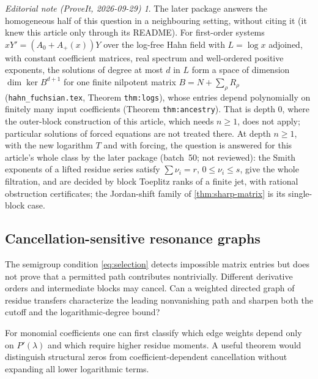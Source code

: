 \documentclass[11pt,a4paper]{article}
\numberwithin{equation}{section}
\theoremstyle{definition}
\theoremstyle{remark}
\newtheorem*{ednote}{Editorial note (ProveIt, 2026-09-29)}
\begin{document}
\begin{ednote}\label{ed:filtration}
The later package  answers the homogeneous half of this question in a neighbouring setting, without citing it (it knew this article only through its README). For first-order systems $xY'=(A_0+A_+(x))Y$ over the log-free Hahn field with $L=\log x$ adjoined, with constant coefficient matrices, real spectrum and well-ordered positive exponents, the solutions of degree at most $d$ in $L$ form a space of dimension $\dim\ker B^{d+1}$ for one finite nilpotent matrix $B=N+\sum_\rho R_\rho$ (\texttt{hahn\_fuchsian.tex}, Theorem \texttt{thm:logs}), whose entries depend polynomially on finitely many input coefficients (Theorem \texttt{thm:ancestry}). That is depth $0$, where the outer-block construction of this article, which needs $n\ge1$, does not apply; particular solutions of forced equations are not treated there.
At depth $n\ge1$, with the new logarithm $T$ and with forcing, the question is answered for this article's whole class by the later package  (batch~50; not reviewed): the Smith exponents of a lifted residue series satisfy $\sum\nu_i=r$, $0\le\nu_i\le s$, give the whole filtration, and are decided by block Toeplitz ranks of a finite jet, with rational obstruction certificates; the Jordan-shift family of \cref{thm:sharp-matrix} is its single-block case.
\end{ednote}

\subsection{Cancellation-sensitive resonance graphs}
The semigroup condition \eqref{eq:selection} detects impossible matrix entries but does not prove that a permitted path contributes nontrivially. Different derivative orders and intermediate blocks may cancel. Can a weighted directed graph of residue transfers characterize the leading nonvanishing path and sharpen both the cutoff and the logarithmic-degree bound?

For monomial coefficients one can first classify which edge weights depend only on $P'(\lambda)$ and which require higher residue moments. A useful theorem would distinguish structural zeros from coefficient-dependent cancellation without expanding all lower logarithmic terms.
\end{document}
